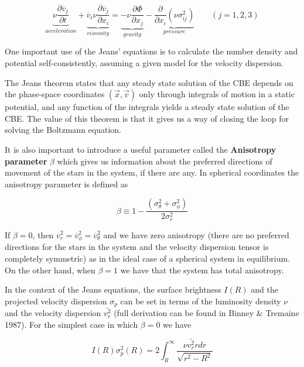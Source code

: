 \begin{equation}	
	\underbrace{\nu \frac{\partial \overline{v}_j}{\partial t}}_{acceleration} + \underbrace{\overline{v}_i\nu \frac{\partial\overline{v}_j}{\partial x_{i}}}_{viscosity} = \underbrace{-\nu \frac{\partial\Phi}{\partial x_{j}}}_{gravity} - \underbrace{\frac{\partial}{\partial x_{i}}(\nu \sigma_{ij}^{2})}_{pressure}\quad\quad (j=1,2,3)
\end{equation}

One important use of the Jeans' equations is to calculate the number density and potential self-consistently, assuming
a given model for the velocity dispersion.

The Jeans theorem states that any steady state solution of the CBE depends on the phase-space coordinates $(\vec{x},\vec{v})$ only through integrals of motion in a static potential, and any function of the integrals yields a steady state solution of the CBE. The value of this theorem is that it gives us a way of closing the loop for solving the Boltzmann equation. 

It is also important to introduce a useful parameter called the \textbf{Anisotropy parameter} $\beta$ which gives us information about the preferred directions of movement of the stars in the system, if there are any. In spherical coordinates the anisotropy parameter is defined as

\begin{equation}
\beta \equiv 1-\frac{\left(\sigma_{\theta}^{2}+\sigma_{\phi}^{2}\right)}{2\sigma_{r}^{2}}
\end{equation}

If $\beta=0$, then $\overline{v}_{r}^{2}=\overline{v}_{\phi}^{2}=\overline{v}_{\theta}^{2}$ and we have zero anisotropy (there are no preferred directions for the stars in the system and the velocity dispersion tensor is completely symmetric) as in the ideal case of a spherical system in equilibrium. On the other hand, when $\beta=1$ we have that the system has total anisotropy.

In the context of the Jeans equations, the surface brightness $I(R)$ and the projected velocity dispersion $\sigma_{p}$ can be set in terms of the luminosity density $\nu$ and the velocity dispersion $\bar{v_{r}^{2}}$ (full derivation can be found in Binney \& Tremaine 1987). For the simplest case in which $\beta=0$ we have

\begin{equation}
I(R)\sigma_{p}^{2}(R)=2\int_{R}^{\infty}\frac{\nu\bar{v_{r}^{2}}rdr}{\sqrt{r^{2}-R^{2}}}
\end{equation}     

